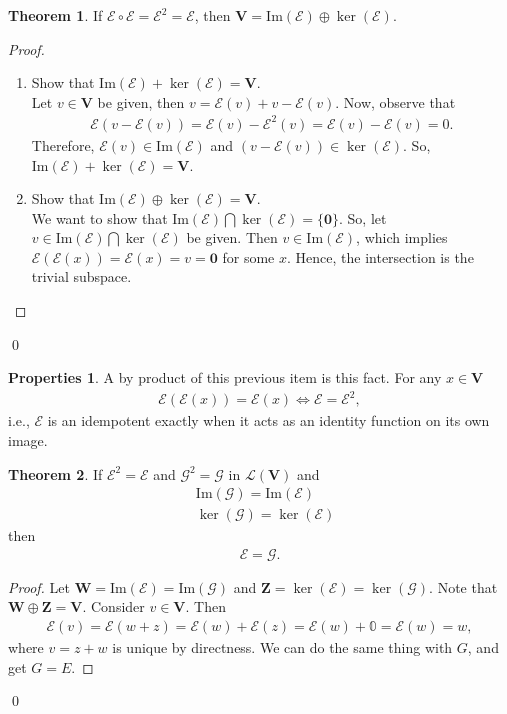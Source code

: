 \documentclass{article}
\theoremstyle{definition}
\newtheorem{prop}{Properties}[section]
\newtheorem{thm}{Theorem}[section]
\newcommand{\V}{\mathbf{V}}
\newcommand{\W}{\mathbf{W}}
\newcommand{\Z}{\mathbf{Z}}
\newcommand{\lag}{\mathcal{L}}
\newcommand{\E}{\mathcal{E}}
\newcommand{\ima}{\text{Im}}
\begin{document}
\begin{thm}
	If $\E \circ \E = \E^2 = \E$, then $\V = \ima(\E)\oplus \ker(\E)$.
	
	\begin{proof}
		$\,$
		\begin{enumerate}
			\item Show that $\ima(\E) + \ker(\E) = \V$.\\
			
			Let $v\in \V$ be given, then $v = \E(v) + v - \E(v)$. Now, observe that
			\begin{align*}
			\E(v - \E(v)) = \E(v) - \E^2(v) = \E(v) - \E(v) = 0.
			\end{align*}
			Therefore, $\E(v)\in \ima(\E)$ and $ (v - \E(v)) \in \ker(\E)$. So, $\ima(\E) + \ker(\E) = \V$.
			
			
			\item Show that $\ima(\E)\oplus \ker(\E) = \V$.\\
			
			We want to show that $\ima(\E) \bigcap \ker(\E) = \{\mathbf{0}\}$. So, let $v\in \ima(\E) \bigcap \ker(\E) $ be given. Then $v\in \ima(\E)$, which implies $\E(\E(x)) = \E(x) = v = \mathbf{0}$ for some $x$. Hence, the intersection is the trivial subspace.
	
			
			
		\end{enumerate}
	\end{proof} 
\qed
\end{thm} 

\begin{prop}
	A by product of this previous item is this fact. For any $x\in \V$
	\begin{align}
	\E(\E(x)) = \E(x) \iff \E = \E^2,
	\end{align}
	i.e., $\E$ is an idempotent exactly when it acts as an identity function on its own image.\\
\end{prop}


\begin{thm}
	If $\E^2 = \E$ and $\mathcal{G}^2 = \mathcal{G} $ in $\lag(\V)$ and 
	\begin{align*}
	&\ima(\mathcal{G}) = \ima(\E)\\
	&\ker(\mathcal{G}) = \ker(\E)
	\end{align*}
	then
	\begin{align*}
	\E = \mathcal{G}.
	\end{align*}
	
	\begin{proof}
		Let $\W = \ima(\E) = \ima(\mathcal{G})$ and $\Z = \ker(\E) = \ker(\mathcal{G})$. Note that $\W \oplus \Z = \V$. Consider $v\in \V$. Then
		\begin{align*}
		\E(v) = \E(w+z) = \E(w) + \E(z) = \E(w) + \mathbb{0} = \E(w) = w,
		\end{align*}
		where $v = z+w$ is unique by directness. We can do the same thing with $G$, and get $G = E$.
	\end{proof}
\qed
\end{thm}
\end{document}
